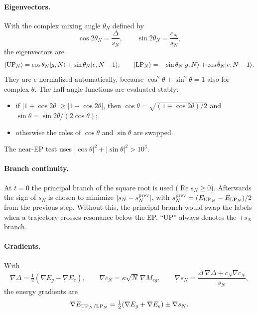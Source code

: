 \documentclass[11pt]{article}
\newcommand{\ket}[1]{\lvert #1 \rangle}
\newcommand{\grad}{\nabla}
\newcommand{\Rep}{\operatorname{Re}}
\begin{document}
\paragraph{Eigenvectors.} With the complex mixing angle $\theta_N$ defined by
\begin{equation}
\cos2\theta_N=\frac{\Delta}{s_N},\qquad \sin2\theta_N=\frac{c_N}{s_N},
\end{equation}
the eigenvectors are
\begin{equation}
\ket{{\rm UP}_N}=\cos\theta_N\ket{g,N}+\sin\theta_N\ket{e,N-1},\qquad
\ket{{\rm LP}_N}=-\sin\theta_N\ket{g,N}+\cos\theta_N\ket{e,N-1}.
\end{equation}
They are c-normalized automatically, because $\cos^2\theta+\sin^2\theta=1$ also for complex $\theta$. The half-angle functions are evaluated stably:
\begin{itemize}
\item if $|1+\cos2\theta|\ge|1-\cos2\theta|$, then $\cos\theta=\sqrt{(1+\cos2\theta)/2}$ and $\sin\theta=\sin2\theta/(2\cos\theta)$;
\item otherwise the roles of $\cos\theta$ and $\sin\theta$ are swapped.
\end{itemize}
The near-EP test uses $|\cos\theta|^2+|\sin\theta|^2>10^3$.

\paragraph{Branch continuity.} At $t=0$ the principal branch of the square root is used ($\Rep s_N\ge0$). Afterwards the sign of $s_N$ is chosen to minimize $|s_N-s_N^{\rm prev}|$, with $s_N^{\rm prev}=(E_{{\rm UP}_N}-E_{{\rm LP}_N})/2$ from the previous step. Without this, the principal branch would swap the labels when a trajectory crosses resonance below the EP. ``UP'' always denotes the $+s_N$ branch.

\paragraph{Gradients.} With
\begin{equation}
\grad\Delta=\tfrac12(\grad E_g-\grad E_e),\qquad \grad c_N=\kappa\sqrt N\,\grad M_{eg},
\qquad
\grad s_N=\frac{\Delta\,\grad\Delta+c_N\grad c_N}{s_N},
\end{equation}
the energy gradients are
\begin{equation}
\grad E_{{\rm UP}_N/{\rm LP}_N}=\tfrac12(\grad E_g+\grad E_e)\pm\grad s_N .
\end{equation}
\end{document}
